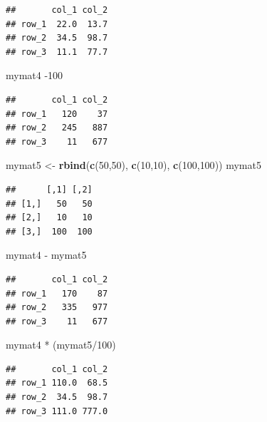 \documentclass[]{book}
\newenvironment{Shaded}{\begin{snugshade}}{\end{snugshade}}
\newcommand{\KeywordTok}[1]{\textcolor[rgb]{0.13,0.29,0.53}{\textbf{{#1}}}}
\newcommand{\DecValTok}[1]{\textcolor[rgb]{0.00,0.00,0.81}{{#1}}}
\newcommand{\StringTok}[1]{\textcolor[rgb]{0.31,0.60,0.02}{{#1}}}
\newcommand{\NormalTok}[1]{{#1}}
\begin{document}
\begin{verbatim}
##       col_1 col_2
## row_1  22.0  13.7
## row_2  34.5  98.7
## row_3  11.1  77.7
\end{verbatim}

\begin{Shaded}
\begin{Highlighting}[]
\NormalTok{mymat4 -}\DecValTok{100}
\end{Highlighting}
\end{Shaded}

\begin{verbatim}
##       col_1 col_2
## row_1   120    37
## row_2   245   887
## row_3    11   677
\end{verbatim}

\begin{Shaded}
\begin{Highlighting}[]
\NormalTok{mymat5 <-}\StringTok{ }\KeywordTok{rbind}\NormalTok{(}\KeywordTok{c}\NormalTok{(}\DecValTok{50}\NormalTok{,}\DecValTok{50}\NormalTok{), }\KeywordTok{c}\NormalTok{(}\DecValTok{10}\NormalTok{,}\DecValTok{10}\NormalTok{), }\KeywordTok{c}\NormalTok{(}\DecValTok{100}\NormalTok{,}\DecValTok{100}\NormalTok{))}
\NormalTok{mymat5}
\end{Highlighting}
\end{Shaded}

\begin{verbatim}
##      [,1] [,2]
## [1,]   50   50
## [2,]   10   10
## [3,]  100  100
\end{verbatim}

\begin{Shaded}
\begin{Highlighting}[]
\NormalTok{mymat4 -}\StringTok{ }\NormalTok{mymat5}
\end{Highlighting}
\end{Shaded}

\begin{verbatim}
##       col_1 col_2
## row_1   170    87
## row_2   335   977
## row_3    11   677
\end{verbatim}

\begin{Shaded}
\begin{Highlighting}[]
\NormalTok{mymat4 *}\StringTok{ }\NormalTok{(mymat5/}\DecValTok{100}\NormalTok{)}
\end{Highlighting}
\end{Shaded}

\begin{verbatim}
##       col_1 col_2
## row_1 110.0  68.5
## row_2  34.5  98.7
## row_3 111.0 777.0
\end{verbatim}
\end{document}
